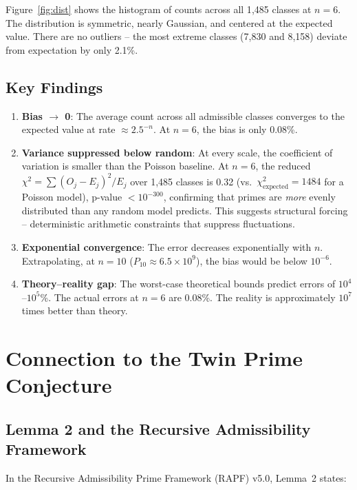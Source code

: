 \documentclass[11pt]{article}
\begin{document}
Figure~\ref{fig:dist} shows the histogram of counts across all 1{,}485
classes at $n=6$. The distribution is symmetric, nearly Gaussian, and
centered at the expected value. There are no outliers -- the most extreme
classes (7{,}830 and 8{,}158) deviate from expectation by only 2.1\%.

\subsection{Key Findings}

\begin{enumerate}
\item \textbf{Bias $\to$ 0}: The average count across all admissible
classes converges to the expected value at rate $\approx 2.5^{-n}$.
At $n=6$, the bias is only 0.08\%.

\item \textbf{Variance suppressed below random}: At every scale, the
coefficient of variation is smaller than the Poisson baseline. At $n=6$,
the reduced $\chi^2 = \sum (O_j - E_j)^2/E_j$ over 1{,}485 classes is
0.32 (vs.\ $\chi^2_{\text{expected}} = 1484$ for a Poisson model),
p-value $< 10^{-300}$, confirming that primes are \emph{more} evenly
distributed than any random model predicts. This suggests structural
forcing -- deterministic arithmetic constraints that suppress fluctuations.

\item \textbf{Exponential convergence}: The error decreases
exponentially with $n$. Extrapolating, at $n=10$ ($P_{10} \approx
6.5 \times 10^9$), the bias would be below $10^{-6}$.

\item \textbf{Theory--reality gap}: The worst-case theoretical bounds
predict errors of $10^4$--$10^5$\%. The actual errors at $n=6$ are
0.08\%. The reality is approximately $10^7$ times better than
theory.
\end{enumerate}

\section{Connection to the Twin Prime Conjecture}

\subsection{Lemma 2 and the Recursive Admissibility Framework}

In the Recursive Admissibility Prime Framework (RAPF) v5.0,
Lemma~2 states:
\end{document}
